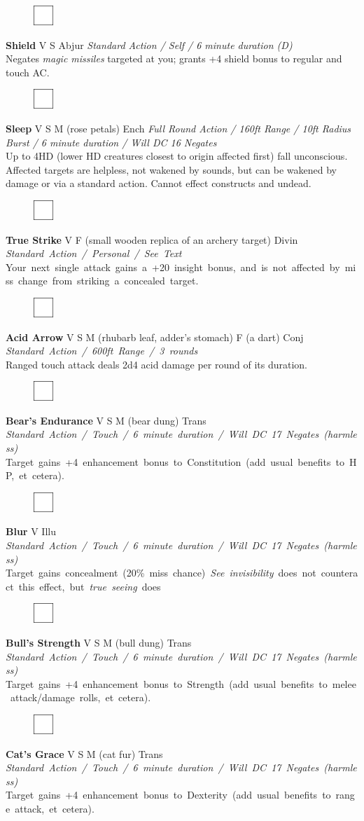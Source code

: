 \documentclass[letterpaper]{article}
\newcommand{\spell}[7]{
\begin{figure}
\vspace{-13pt}
\ifstrequal{#2}{Full}{  \includegraphics[width=2em]{Checkbox-Full}}{
\ifstrequal{#2}{Scroll}{\includegraphics[width=2em]{Checkbox-S}}{
                        \includegraphics[width=2em]{Checkbox}}}
\ifstrequal{#7}{}{\vspace{-1em}}{\vspace{#7}}
\end{figure}
\noindent \textbf{#1} #3 {
    \ifstrequal{#4}{Conj}{\color{Plum}Conj}{%
    \ifstrequal{#4}{Divin}{\color{YellowOrange}Divin}{%
    \ifstrequal{#4}{Ench}{\color{VioletRed}Ench}{%
    \ifstrequal{#4}{Trans}{\color{LimeGreen}Trans}{%
    \ifstrequal{#4}{Evoc}{\color{RedOrange}Evoc}{%
    \ifstrequal{#4}{Illu}{\color{ProcessBlue}Illu}{%
    \ifstrequal{#4}{Abjur}{\color{CadetBlue}Abjur}{%
    \ifstrequal{#4}{Necro}{\color{Red}Necro}{%
}}}}}}}}}
{\footnotesize \emph{#5}} \\
#6
}
\begin{document}
\spell{Shield}{}{V S}{Abjur}{Standard Action / Self / 6 minute duration (D)}{%
Negates \emph{magic missiles} targeted at you; grants +4 shield bonus to regular and touch AC.}{}\\[-1em] %

\spell{Sleep}{}{V S M (rose petals)}{Ench}{Full Round Action / 160ft Range / 10ft Radius Burst / 6 minute duration / Will DC 16 \nolinebreak Negates}{%
Up to 4HD (lower HD creatures closest to origin affected first) fall unconscious.  Affected targets are helpless, not wakened by sounds, but can be wakened by damage or via a standard action. Cannot effect constructs and undead.}{}\\[-1em] %

\spell{True Strike}{}{V F (small wooden replica of an archery target)}{Divin}{\mbox{Standard Action / Personal / See Text}}{%
\mbox{Your next single attack gains a +20 insight bonus, and is not affected by miss change from striking a concealed target.}}{}\\

\spell{Acid Arrow}{}{V S M (rhubarb leaf, adder's stomach) F (a dart)}{Conj}{\mbox{Standard Action / 600ft Range / 3 rounds}}{%
Ranged touch attack deals 2d4 acid damage per round of its duration.}{}\\[-1em] %

\spell{Bear's Endurance}{}{V S M (bear dung)}{Trans}{\mbox{Standard Action / Touch / 6 minute duration / Will DC 17 Negates (harmless)}} {%
\mbox{Target gains +4 enhancement bonus to Constitution (add usual benefits to HP, et cetera).} }{}\\[-1em] %

\spell{Blur}{}{V}{Illu}{\mbox{Standard Action / Touch / 6 minute duration / Will DC 17 Negates (harmless)}}{%
\mbox{Target gains concealment (20\% miss chance) \emph{See invisibility} does not counteract this effect, but \emph{true seeing} does} }{}\\[-1em] %

\spell{Bull's Strength}{}{V S M (bull dung)}{Trans}{\mbox{Standard Action / Touch / 6 minute duration / Will DC 17 Negates (harmless)}}{%
\mbox{Target gains +4 enhancement bonus to Strength (add usual benefits to melee attack/damage rolls, et cetera).} }{}\\[-1em] %

\spell{Cat's Grace}{}{V S M (cat fur)}{Trans}{\mbox{Standard Action / Touch / 6 minute duration / Will DC 17 Negates (harmless)}}{%
\mbox{Target gains +4 enhancement bonus to Dexterity (add usual benefits to range attack, et cetera).} }{}\\[-1em] %
\end{document}
